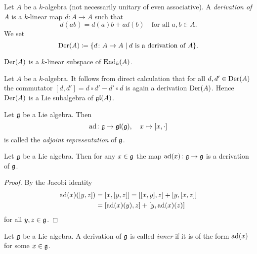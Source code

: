 \begin{defi}
 Let $A$ be a $k$-algebra (not necessarily unitary of even associative). A \emph{derivation of $A$} is a $k$-linear map $d \colon A \to A$ such that
 \[
  d(ab) = d(a)b + ad(b) \quad \text{for all $a,b \in A$}.
 \]
 We set
 \[
  \operatorname{Der}(A) \coloneqq \{d \colon A \to A \mid \text{$d$ is a derivation of $A$} \}.
 \]
\end{defi}


\begin{rem}
 $\operatorname{Der}(A)$ is a $k$-linear subspace of $\operatorname{End}_k(A)$.
\end{rem}


\begin{expl}
  Let $A$ be a $k$-algebra. It follows from direct calculation that for all $d, d' \in \operatorname{Der}(A)$ the commutator $[d,d'] = d \circ d' - d' \circ d$ is again a derivation $\operatorname{Der}(A)$. Hence $\operatorname{Der}(A)$ is a Lie subalgebra of $\mathfrak{gl}(A)$.
\end{expl}


\begin{defi}
 Let $\mathfrak{g}$ be a Lie algebra. Then
 \[
  \operatorname{ad} \colon \mathfrak{g} \to \mathfrak{gl}(\mathfrak{g}), \quad x \mapsto [x,\cdot]
 \]
 is called the \emph{adjoint representation} of $\mathfrak{g}$.
\end{defi}


\begin{lem}\label{lem: Lie algebras act adjoint by derivations}
 Let $\mathfrak{g}$ be a Lie algebra. Then for any $x \in \mathfrak{g}$ the map $\operatorname{ad}(x) \colon \mathfrak{g} \to \mathfrak{g}$ is a derivation of $\mathfrak{g}$.
\end{lem}
\begin{proof}
 By the Jacobi identity
 \begin{align*}
  \operatorname{ad}(x)([y,z])
  &= [x,[y,z]]
  = [[x,y],z] + [y,[x,z]] \\
  &= [\operatorname{ad}(x)(y),z] + [y,\operatorname{ad}(x)(z)]
 \end{align*}
 for all $y,z \in \mathfrak{g}$.
\end{proof}


\begin{defi}
 Let $\mathfrak{g}$ be a Lie algebra. A derivation of $\mathfrak{g}$ is called \emph{inner} if it is of the form $\operatorname{ad}(x)$ for some $x \in \mathfrak{g}$.
\end{defi}


